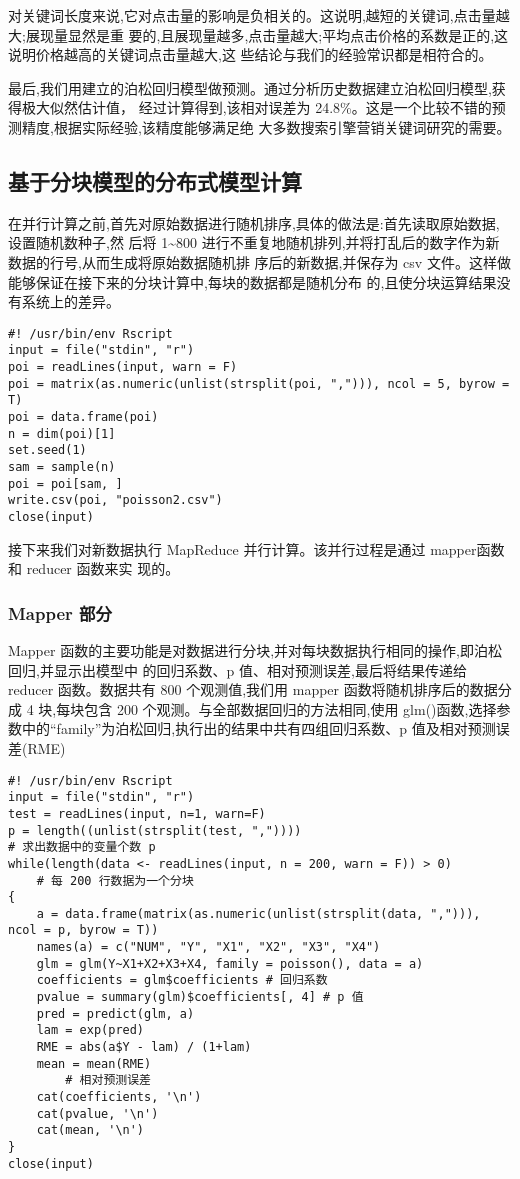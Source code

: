 对关键词长度来说,它对点击量的影响是负相关的。这说明,越短的关键词,点击量越大;展现量显然是重
要的,且展现量越多,点击量越大;平均点击价格的系数是正的,这说明价格越高的关键词点击量越大,这
些结论与我们的经验常识都是相符合的。

最后,我们用建立的泊松回归模型做预测。通过分析历史数据建立泊松回归模型,获得极大似然估计值，
经过计算得到,该相对误差为
24.8\%。这是一个比较不错的预测精度,根据实际经验,该精度能够满足绝
大多数搜索引擎营销关键词研究的需要。

\subsection{基于分块模型的分布式模型计算}\label{ux57faux4e8eux5206ux5757ux6a21ux578bux7684ux5206ux5e03ux5f0fux6a21ux578bux8ba1ux7b97}

在并行计算之前,首先对原始数据进行随机排序,具体的做法是:首先读取原始数据,设置随机数种子,然
后将 1\textasciitilde{}800
进行不重复地随机排列,并将打乱后的数字作为新数据的行号,从而生成将原始数据随机排
序后的新数据,并保存为 csv
文件。这样做能够保证在接下来的分块计算中,每块的数据都是随机分布
的,且使分块运算结果没有系统上的差异。

\begin{lstlisting}
#! /usr/bin/env Rscript
input = file("stdin", "r")
poi = readLines(input, warn = F)
poi = matrix(as.numeric(unlist(strsplit(poi, ","))), ncol = 5, byrow = T)
poi = data.frame(poi)
n = dim(poi)[1]
set.seed(1)
sam = sample(n)
poi = poi[sam, ]
write.csv(poi, "poisson2.csv")
close(input)
\end{lstlisting}

接下来我们对新数据执行 MapReduce 并行计算。该并行过程是通过 mapper函数和
reducer 函数来实 现的。

\subsubsection{Mapper 部分}\label{mapper-ux90e8ux5206}

Mapper
函数的主要功能是对数据进行分块,并对每块数据执行相同的操作,即泊松回归,并显示出模型中
的回归系数、p 值、相对预测误差,最后将结果传递给 reducer 函数。数据共有
800 个观测值,我们用 mapper 函数将随机排序后的数据分成 4 块,每块包含 200
个观测。与全部数据回归的方法相同,使用
glm()函数,选择参数中的``family''为泊松回归,执行出的结果中共有四组回归系数、p
值及相对预测误 差(RME)

\begin{lstlisting}
#! /usr/bin/env Rscript
input = file("stdin", "r")
test = readLines(input, n=1, warn=F)
p = length((unlist(strsplit(test, ","))))
# 求出数据中的变量个数 p
while(length(data <- readLines(input, n = 200, warn = F)) > 0)
    # 每 200 行数据为一个分块
{
    a = data.frame(matrix(as.numeric(unlist(strsplit(data, ","))), ncol = p, byrow = T))
    names(a) = c("NUM", "Y", "X1", "X2", "X3", "X4")
    glm = glm(Y~X1+X2+X3+X4, family = poisson(), data = a)
    coefficients = glm$coefficients # 回归系数
    pvalue = summary(glm)$coefficients[, 4] # p 值
    pred = predict(glm, a)
    lam = exp(pred)
    RME = abs(a$Y - lam) / (1+lam)
    mean = mean(RME)
        # 相对预测误差
    cat(coefficients, '\n')
    cat(pvalue, '\n')
    cat(mean, '\n')
}
close(input)
\end{lstlisting}

